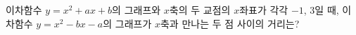 이차함수 $y=x^2+ax+b$의 그래프와 $x$축의 두 교점의 $x$좌표가 각각 $-1$, $3$일 때, 이차함수 $y=x^2-bx-a$의 그래프가 $x$축과 만나는 두 점 사이의 거리는? 
